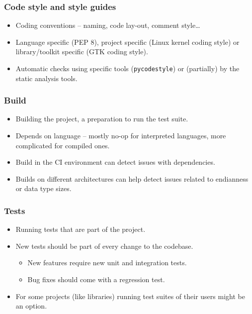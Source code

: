 \documentclass[aspectratio=169]{beamer}
\begin{document}
\begin{frame}
	\frametitle{Code style and style guides}

	\begin{block}{}
		\begin{itemize}
			\item Coding conventions -- naming, code lay-out, comment style…
			\item Language specific (PEP 8\footnotemark), project specific (Linux kernel coding style\footnotemark) or library/toolkit specific (GTK coding style\footnotemark).
			\item Automatic checks using specific tools (\texttt{pycodestyle}) or (partially) by the static analysis tools.
		\end{itemize}
	\end{block}

\end{frame}

\begin{frame}
	\frametitle{Build}
	
	\begin{block}{}
		\begin{itemize}
			\item Building the project, a preparation to run the test suite.
			\item Depends on language -- mostly no-op for interpreted languages, more complicated for compiled ones.
			\item Build in the CI environment can detect issues with dependencies.
			\item Builds on different architectures can help detect issues related to endianness or data type sizes.
		\end{itemize}
	\end{block}
\end{frame}

\begin{frame}
	\frametitle{Tests}
	
	\begin{block}{}
		\begin{itemize}
			\item Running tests that are part of the project.
			\item  New tests should be part of every change to the codebase.
			\begin{itemize}
				\item New features require new unit and integration tests.
				\item Bug fixes should come with a regression test.
			\end{itemize}
			\item For some projects (like libraries) running test suites of their users might be an option.
		\end{itemize}
	\end{block}
\end{frame}
\end{document}
